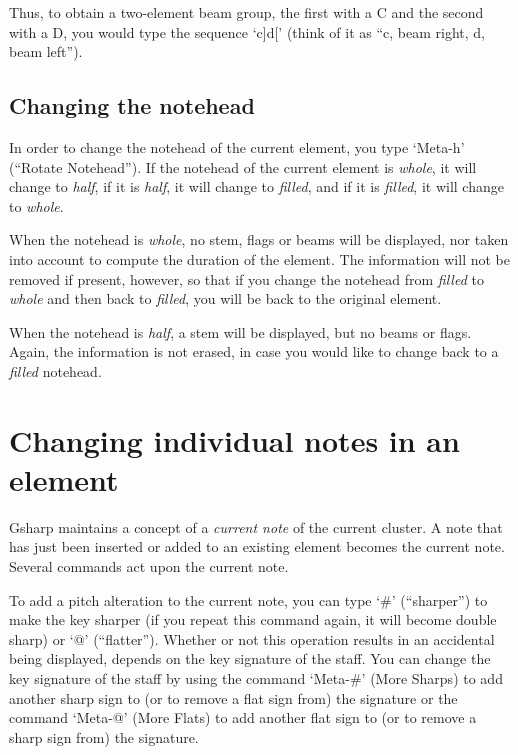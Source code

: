 \documentclass[11pt]{book}
\def\gs{Gsharp}
\def\kbd#1{`#1'}
\def\command#1{``#1''}
\begin{document}
Thus, to obtain a two-element beam group, the first with a C and the
second with a D, you would type the sequence \kbd{c]d[} (think of it
as ``c, beam right, d, beam left'').  

\section{Changing the notehead}

In order to change the notehead of the current element, you type
\kbd{Meta-h} (\command{Rotate Notehead}).  If the notehead of the current
element is \emph{whole}, it will change to \emph{half}, if it is
\emph{half}, it will change to \emph{filled}, and if it is
\emph{filled}, it will change to \emph{whole}.  

When the notehead is \emph{whole}, no stem, flags or beams will be
displayed, nor taken into account to compute the duration of the
element.  The information will not be removed if present, however, so
that if you change the notehead from \emph{filled} to \emph{whole} and
then back to \emph{filled}, you will be back to the original element. 

When the notehead is \emph{half}, a stem will be displayed, but no
beams or flags.  Again, the information is not erased, in case you
would like to change back to a \emph{filled} notehead. 

\chapter{Changing individual notes in an element}

{\gs} maintains a concept of a \emph{current note} of the current cluster.  A note that has
just been inserted or added to an existing element becomes the
current note.  Several commands act upon the current note. 

To add a pitch alteration to the current note, you can type \kbd{\#}
(\command{sharper}) to make the key sharper (if you repeat this
command again, it will become double sharp) or \kbd{@}
(\command{flatter}).  Whether or not this operation results in an
accidental being displayed, depends on the key signature of the staff.
You can change the key signature of the staff by using the command
\kbd{Meta-\#} (More Sharps) to add another sharp sign to (or to remove
a flat sign from) the signature or the command \kbd{Meta-@} (More
Flats) to add another flat sign to (or to remove a sharp sign from)
the signature. 
\end{document}
